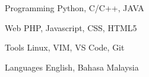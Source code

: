 

\begin{cvskills}

  \cvskill
    {Programming} %
    {Python, C/C++, JAVA} %

  \cvskill
    {Web} %
    {PHP, Javascript, CSS, HTML5} %

  \cvskill
    {Tools} %
    {Linux, VIM, VS Code, Git} %

  \cvskill
    {Languages} %
    {English, Bahasa Malaysia} %

\end{cvskills}
